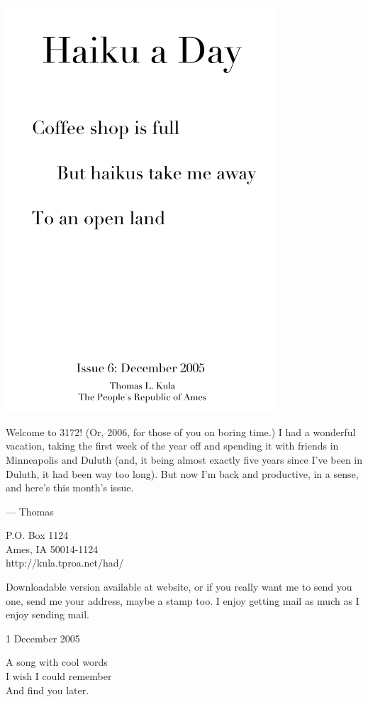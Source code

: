\documentclass[12pt]{article}
\begin{document}
\includegraphics[width=101mm]{frontpage.png}

\newpage

Welcome to 3172! (Or, 2006, for those of you on boring
time.) I had a wonderful
vacation, taking the first week of the year off and
spending it with friends in Minneapolis and Duluth
(and, it being almost exactly five years since I've
been in Duluth, it had been way too long). But now
I'm back and productive, in a sense, and here's 
this month's issue.

--- Thomas

P.O. Box 1124 \\
Ames, IA 50014-1124 \\
http://kula.tproa.net/had/

Downloadable version available at website, or if you really
want me to send you one, send me your address, maybe a
stamp too. I enjoy getting mail as much as I enjoy sending
mail.\\

\setlength{\parskip}{1mm}

1 December 2005

A song with cool words \\
I wish I could remember \\
And find you later. 
\end{document}
